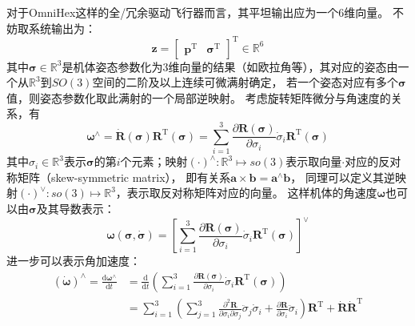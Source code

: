 对于OmniHex这样的全/冗余驱动飞行器而言，其平坦输出应为一个6维向量。
不妨取系统输出为：
\begin{equation}
    \bm{z} = 
    \begin{bmatrix}
        \bm{p}^{\text{T}} & \bm{\sigma}^{\text{T}}
    \end{bmatrix}^{\text{T}} \in \mathbb{R}^6
    \label{equ:omnihex_output}
\end{equation}
其中$\bm{\sigma} \in \mathbb{R}^3$是机体姿态参数化为3维向量的结果（如欧拉角等），其对应的姿态由一个从$\mathbb{R}^3$到$SO(3)$空间的二阶及以上连续可微满射确定，
若一个姿态对应有多个$\bm{\sigma}$值，则姿态参数化取此满射的一个局部逆映射。
考虑旋转矩阵微分与角速度的关系，有
\begin{equation}
    \bm{\omega}^{\wedge}
     = \dot{\bm{R}}(\bm{\sigma})\bm{R}^{\text{T}}(\bm{\sigma})
     = \sum_{i=1}^3 \frac{\partial \bm{R}(\bm{\sigma})}{\partial \sigma_i}\dot{\sigma}_i\bm{R}^{\text{T}}(\bm{\sigma})
     \label{equ:dsigma_to_omega_hat}
\end{equation}
其中$\sigma_i \in \mathbb{R}^3$表示$\bm{\sigma}$的第$i$个元素；映射$(\cdot)^{\wedge}:\mathbb{R}^3 \mapsto so(3)$表示取向量$\cdot$对应的反对称矩阵（skew-symmetric matrix），
即有关系$\bm{a} \times \bm{b} = \bm{a}^{\wedge}\bm{b}$，
同理可以定义其逆映射$(\cdot)^{\vee}:so(3) \mapsto \mathbb{R}^3$，表示取反对称矩阵对应的向量。
这样机体的角速度$\bm{\omega}$也可以由$\bm{\sigma}$及其导数表示：
\begin{equation}
    \bm{\omega}(\bm{\sigma}, \dot{\bm{\sigma}}) = 
    \left[
        \sum_{i=1}^3 \frac{\partial \bm{R}(\bm{\sigma})}{\partial \sigma_i}\dot{\sigma}_i\bm{R}^{\text{T}}(\bm{\sigma})
    \right]^{\vee}
    \label{equ:dsigma_to_omega}
\end{equation}
进一步可以表示角加速度：
\begin{equation}
    \begin{aligned}
        (\dot{\bm{\omega}})^{\wedge} = \frac{\text{d}\bm{\omega}^{\wedge}}{\text{d}t} &=
        \frac{\text{d}}{\text{d}t}\left(\sum_{i=1}^3 \frac{\partial \bm{R}(\bm{\sigma})}{\partial \sigma_i}\dot{\sigma}_i\bm{R}^{\text{T}}(\bm{\sigma})\right) \\
        &= \sum_{i=1}^3 \left(\sum_{j=1}^3 \frac{\partial^2 \bm{R}}{\partial\sigma_i\partial\sigma_j}\ddot{\sigma}_j\dot{\sigma}_i + \frac{\partial \bm{R}}{\partial \sigma_i}\ddot{\sigma}_i\right)\bm{R}^{\text{T}} + 
        \dot{\bm{R}}\dot{\bm{R}}^{\text{T}}
    \end{aligned}
    \label{equ:dsigma_to_d1omega}
\end{equation}
